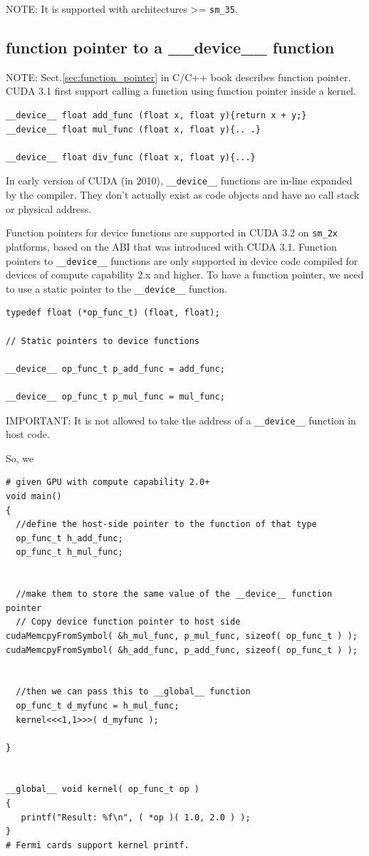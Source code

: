 NOTE: It is supported with architectures >= \verb!sm_35!.
  


\subsection{function pointer to a \_\_device\_\_ function}
\label{sec:function_pointer-CUDA}

NOTE: Sect.\ref{sec:function_pointer} in C/C++ book describes function pointer.
CUDA 3.1 first support calling a function using function pointer inside a kernel.

\begin{lstlisting}
__device__ float add_func (float x, float y){return x + y;}
__device__ float mul_func (float x, float y){.. .}

__device__ float div_func (float x, float y){...}

\end{lstlisting}


In early version of CUDA (in 2010), \verb!__device__! functions are in-line
expanded by the compiler. They don't actually exist as code objects and have no
call stack or physical address.

Function pointers for device functions are supported in CUDA 3.2 on \verb!sm_2x!
platforms, based on the ABI that was introduced with CUDA 3.1.
Function pointers to \verb!__device__! functions are only supported in
device code compiled for devices of compute capability 2.x and higher.
To have a function pointer, we need to use a static pointer to the \verb!__device__! function.
\begin{verbatim}
typedef float (*op_func_t) (float, float);

// Static pointers to device functions

__device__ op_func_t p_add_func = add_func;

__device__ op_func_t p_mul_func = mul_func;

\end{verbatim}
  
IMPORTANT: It is not allowed to take the address of a \verb!__device__! function
in host code.

So, we 
\begin{verbatim}
# given GPU with compute capability 2.0+
void main()
{
  //define the host-side pointer to the function of that type
  op_func_t h_add_func;
  op_func_t h_mul_func;
  
  
  //make them to store the same value of the __device__ function pointer
  // Copy device function pointer to host side
cudaMemcpyFromSymbol( &h_mul_func, p_mul_func, sizeof( op_func_t ) );
cudaMemcpyFromSymbol( &h_add_func, p_add_func, sizeof( op_func_t ) );

  
  //then we can pass this to __global__ function
  op_func_t d_myfunc = h_mul_func;
  kernel<<<1,1>>>( d_myfunc );
 
}


__global__ void kernel( op_func_t op )
{
   printf("Result: %f\n", ( *op )( 1.0, 2.0 ) );
}
# Fermi cards support kernel printf.

\end{verbatim}



